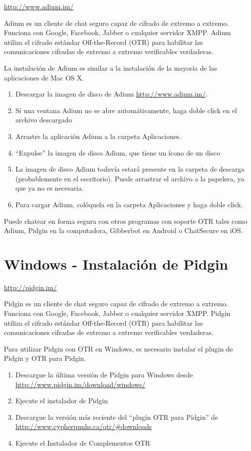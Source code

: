 \documentclass[10pt,a5paper,twoside,,]{book}
\providecommand{\tightlist}{%
  \setlength{\itemsep}{0pt}\setlength{\parskip}{0pt}}
\begin{document}
\url{http://www.adium.im/}

Adium es un cliente de chat seguro capaz de cifrado de extremo a
extremo. Funciona con Google, Facebook, Jabber o cualquier servidor
XMPP. Adium utiliza el cifrado estándar Off-the-Record (OTR) para
habilitar las comunicaciones cifradas de extremo a extremo verificables
verdaderas.

La instalación de Adium es similar a la instalación de la mayoría de las
aplicaciones de Mac OS X.

\begin{enumerate}
\def\labelenumi{\arabic{enumi}.}
\tightlist
\item
  Descargar la imagen de disco de Adium \url{http://www.adium.im/}.
\item
  Si una ventana Adium no se abre automáticamente, haga doble click en
  el archivo descargado
\item
  Arrastre la aplicación Adium a la carpeta Aplicaciones.
\item
  ``Expulse'' la imagen de disco Adium, que tiene un ícono de un disco
\item
  La imagen de disco Adium todavía estará presente en la carpeta de
  descarga (probablemente en el escritorio). Puede arrastrar el archivo
  a la papelera, ya que ya no es necesaria.
\item
  Para cargar Adium, colóquela en la carpeta Aplicaciones y haga doble
  click.
\end{enumerate}

Puede chatear en forma segura con otros programas con soporte OTR tales
como Adium, Pidgin en la computadora, Gibberbot en Android o ChatSecure
en iOS.

\section{Windows - Instalación de
Pidgin}\label{windows---instalaciuxf3n-de-pidgin}

\url{http://pidgin.im/}

Pidgin es un cliente de chat seguro capaz de cifrado de extremo a
extremo. Funciona con Google, Facebook, Jabber o cualquier servidor
XMPP. Pidgin utiliza el cifrado estándar Off-the-Record (OTR) para
habilitar las comunicaciones cifradas de extremo a extremo verificables
verdaderas.

Para utilizar Pidgin con OTR en Windows, es necesario instalar el plugin
de Pidgin y OTR para Pidgin.

\begin{enumerate}
\def\labelenumi{\arabic{enumi}.}
\tightlist
\item
  Descargue la última versión de Pidgin para Windows desde
  \url{http://www.pidgin.im/download/windows/}
\item
  Ejecute el instalador de Pidgin
\item
  Descargue la versión más reciente del ``plugin OTR para Pidgin'' de
  \url{http://www.cypherpunks.ca/otr/\#downloads}
\item
  Ejecute el Instalador de Complementos OTR
\end{enumerate}
\end{document}
